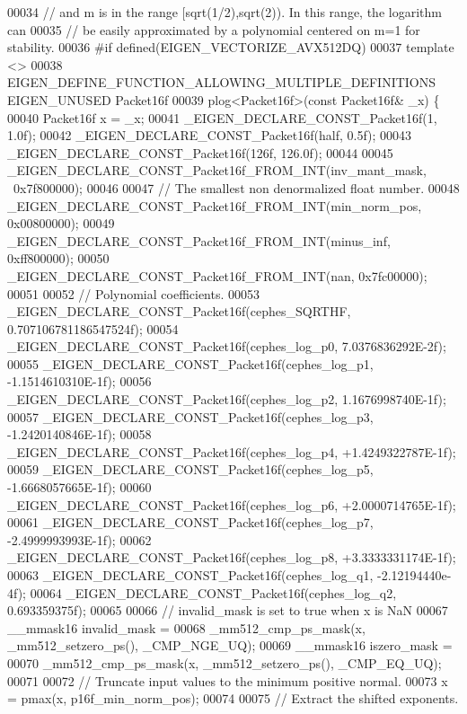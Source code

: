 \begin{DoxyCode}
00034 \textcolor{comment}{// and m is in the range [sqrt(1/2),sqrt(2)). In this range, the logarithm can}
00035 \textcolor{comment}{// be easily approximated by a polynomial centered on m=1 for stability.}
00036 \textcolor{preprocessor}{#if defined(EIGEN\_VECTORIZE\_AVX512DQ)}
00037 \textcolor{keyword}{template} <>
00038 EIGEN\_DEFINE\_FUNCTION\_ALLOWING\_MULTIPLE\_DEFINITIONS EIGEN\_UNUSED Packet16f
00039 plog<Packet16f>(\textcolor{keyword}{const} Packet16f& \_x) \{
00040   Packet16f x = \_x;
00041   \_EIGEN\_DECLARE\_CONST\_Packet16f(1, 1.0f);
00042   \_EIGEN\_DECLARE\_CONST\_Packet16f(half, 0.5f);
00043   \_EIGEN\_DECLARE\_CONST\_Packet16f(126f, 126.0f);
00044 
00045   \_EIGEN\_DECLARE\_CONST\_Packet16f\_FROM\_INT(inv\_mant\_mask, ~0x7f800000);
00046 
00047   \textcolor{comment}{// The smallest non denormalized float number.}
00048   \_EIGEN\_DECLARE\_CONST\_Packet16f\_FROM\_INT(min\_norm\_pos, 0x00800000);
00049   \_EIGEN\_DECLARE\_CONST\_Packet16f\_FROM\_INT(minus\_inf, 0xff800000);
00050   \_EIGEN\_DECLARE\_CONST\_Packet16f\_FROM\_INT(nan, 0x7fc00000);
00051 
00052   \textcolor{comment}{// Polynomial coefficients.}
00053   \_EIGEN\_DECLARE\_CONST\_Packet16f(cephes\_SQRTHF, 0.707106781186547524f);
00054   \_EIGEN\_DECLARE\_CONST\_Packet16f(cephes\_log\_p0, 7.0376836292E-2f);
00055   \_EIGEN\_DECLARE\_CONST\_Packet16f(cephes\_log\_p1, -1.1514610310E-1f);
00056   \_EIGEN\_DECLARE\_CONST\_Packet16f(cephes\_log\_p2, 1.1676998740E-1f);
00057   \_EIGEN\_DECLARE\_CONST\_Packet16f(cephes\_log\_p3, -1.2420140846E-1f);
00058   \_EIGEN\_DECLARE\_CONST\_Packet16f(cephes\_log\_p4, +1.4249322787E-1f);
00059   \_EIGEN\_DECLARE\_CONST\_Packet16f(cephes\_log\_p5, -1.6668057665E-1f);
00060   \_EIGEN\_DECLARE\_CONST\_Packet16f(cephes\_log\_p6, +2.0000714765E-1f);
00061   \_EIGEN\_DECLARE\_CONST\_Packet16f(cephes\_log\_p7, -2.4999993993E-1f);
00062   \_EIGEN\_DECLARE\_CONST\_Packet16f(cephes\_log\_p8, +3.3333331174E-1f);
00063   \_EIGEN\_DECLARE\_CONST\_Packet16f(cephes\_log\_q1, -2.12194440e-4f);
00064   \_EIGEN\_DECLARE\_CONST\_Packet16f(cephes\_log\_q2, 0.693359375f);
00065 
00066   \textcolor{comment}{// invalid\_mask is set to true when x is NaN}
00067   \_\_mmask16 invalid\_mask =
00068       \_mm512\_cmp\_ps\_mask(x, \_mm512\_setzero\_ps(), \_CMP\_NGE\_UQ);
00069   \_\_mmask16 iszero\_mask =
00070       \_mm512\_cmp\_ps\_mask(x, \_mm512\_setzero\_ps(), \_CMP\_EQ\_UQ);
00071 
00072   \textcolor{comment}{// Truncate input values to the minimum positive normal.}
00073   x = pmax(x, p16f\_min\_norm\_pos);
00074 
00075   \textcolor{comment}{// Extract the shifted exponents.}

\end{DoxyCode}
